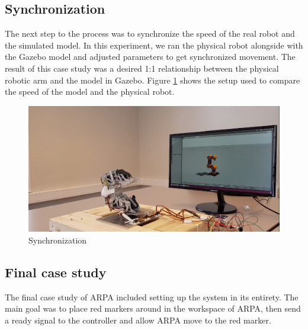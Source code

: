 \documentclass[11pt,a4paper, titlepage]{article}
\begin{document}
	\subsection{Synchronization}
	The next step to the process was to synchronize the speed of the real robot and the simulated model. In this experiment, we ran the physical robot alongside with the Gazebo model and adjusted parameters to get synchronized movement. The result of this case study was a desired 1:1 relationship between the physical robotic arm and the model in Gazebo. Figure \ref{synch} shows the setup used to compare the speed of the model and the physical robot. 
	
	\begin{figure}[H]
		\centering
		\includegraphics[width=\linewidth]{../Diagrams/Synchronizing.png}
		\caption{Synchronization}
		\label{synch}
	\end{figure}
	
	
	\subsection{Final case study}
	The final case study of ARPA included setting up the system in its entirety. The main goal was to place red markers around in the workspace of ARPA, then send a ready signal to the controller and allow ARPA move to the red marker.
	
\end{document}
